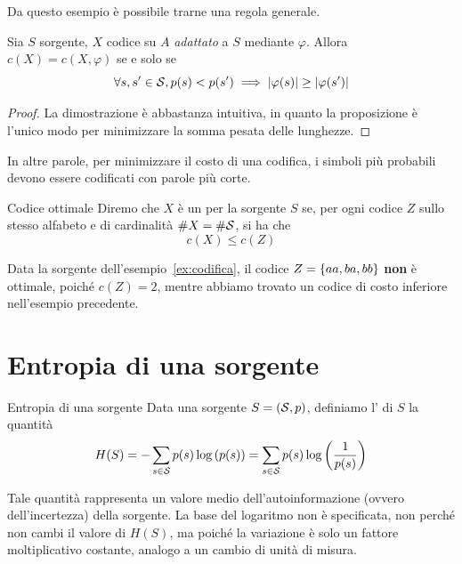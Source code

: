 Da questo esempio è possibile trarne una regola generale.

\begin{proposition}{}
  Sia \(S\) sorgente, \(X\) codice su \(A\) \emph{adattato} a \(S\) mediante \(\varphi\).
  Allora \(c(X) = c(X,\varphi)\) se e solo se
    \[\forall s,s' \in \mathcal{S}, p(s) < p(s') \implies \left|\varphi(s)\right| \geq \left|\varphi(s')\right| \]
\end{proposition}

\begin{proof}
  La dimostrazione è abbastanza intuitiva, in quanto la proposizione è l'unico modo per minimizzare la somma pesata delle lunghezze.
\end{proof}

In altre parole, per minimizzare il costo di una codifica, i simboli più probabili devono essere codificati con parole più corte.

\begin{definition}{Codice ottimale}
  Diremo che \(X\) è un  per la sorgente \(S\) se, per ogni codice \(Z\) sullo stesso alfabeto e di cardinalità \(\# X = \# \mathcal{S}\), si ha che
  \[c(X) \leq c(Z)\]
\end{definition}

\begin{example}{}
  Data la sorgente dell'esempio~\ref{ex:codifica}, il codice \(Z = \set{aa,ba,bb}\) \textbf{non} è ottimale, poiché \(c(Z) = 2\), mentre abbiamo trovato un codice di costo inferiore nell'esempio precedente.
\end{example}

\section{Entropia di una sorgente}

\begin{definition}{Entropia di una sorgente}
  Data una sorgente \(S = (\mathcal{S},p)\), definiamo l' di \(S\) la quantità
  \[H(S) = -\sum_{s \in \mathcal{S}} p(s) \log\left(p(s)\right) = \sum_{s \in \mathcal{S}} p(s) \log\left(\frac{1}{p(s)}\right)\]  
\end{definition}

Tale quantità rappresenta un valore medio dell'autoinformazione (ovvero dell'incertezza) della sorgente.
La base del logaritmo non è specificata, non perché non cambi il valore di \(H(S)\), ma poiché la variazione è solo un fattore moltiplicativo costante, analogo a un cambio di unità di misura.

